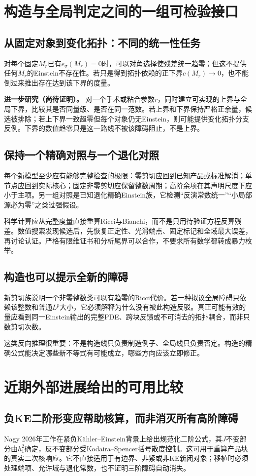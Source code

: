 \documentclass[UTF8,fontset=fandol,zihao=-4]{ctexart}
\theoremstyle{cn}
\newcommand{\newidea}{\par\noindent\textbf{进一步研究（尚待证明）。}}
\begin{document}
\section{构造与全局判定之间的一组可检验接口}
\subsection{从固定对象到变化拓扑：不同的统一性任务}
对每个固定$M_r$已有$e_\sigma(M_r)=0$时，可以对角选择使残差统一趋零；但这不提供任何$M_r$的Einstein不存在性。若只是得到拓扑依赖的正下界$c(M_r)\to0$，也不能倒过来推出存在达到该下界的度量。

\newidea
对一个手术或粘合参数$r$，同时建立可实现的上界与全局下界，比较其是否同量级、是否在同一范数。若上界和下界保持严格正余量，候选被排除；若上下界一致趋零但每个对象仍无Einstein，则可能提供变化拓扑分支反例。下界的数值趋零只是这一路线不被该障碍阻止，不是上界。

\subsection{保持一个精确对照与一个退化对照}
每个新模型至少应有能够完整检查的极限：零剪切应回到已知产品或标准解消；单节点应回到实际核心；固定非零剪切应保留整数周期；高阶余项在其声明尺度下应小于主项。另一组对照是已知退化精确Einstein族，它检测“反演常数统一”“小局部源必为零”之类过强假设。

科学计算应从完整度量直接重算Ricci与Bianchi，而不是只用待验证方程反算残差。数值搜索发现候选后，先恢复正定性、光滑端点、固定标记和全域最大误差，再讨论认证。严格有限维证书和分析尾界可以合作，不要求所有数学都转成暴力枚举。

\subsection{构造也可以提示全新的障碍}
新剪切族说明一个非零整数类可以有趋零的Ricci代价。若一种拟议全局障碍只依赖该整数和普通$L^p$大小，它必须解释为什么没有被此构造反驳。真正可能有效的量应看到同一Einstein输出的完整PDE、跨块反馈或不可消去的拓扑耦合，而非只数剪切次数。

这类反向推理很重要：不是构造线只负责制造例子、全局线只负责否定。构造的精确公式能决定哪些新不等式有可能成立，哪些方向应该立即修正。

\section{近期外部进展给出的可用比较}
\subsection{负KE二阶形变应帮助核算，而非消灭所有高阶障碍}
Nagy 2026年工作在紧负Kähler--Einstein背景上给出规范化二阶公式，其$J$不变部分由$h_1^2$确定，反不变部分受Kodaira--Spencer括号散度控制\cite{Nagy}。这可用于重算产品块的真实二次核响应。它不直接适用于有边界、非紧或非KE新闭对象；移植时必须处理端项、允许域与退化常数，也不证明三阶障碍自动消失。
\end{document}
